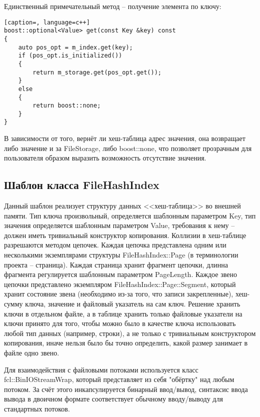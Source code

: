 \documentclass[12pt, a4paper]{fallen_report}
\begin{document}
Единственный примечательный метод – получение элемента по ключу:
\begin{lstlisting}[caption=, language=c++]
boost::optional<Value> get(const Key &key) const 
{
    auto pos_opt = m_index.get(key);
    if (pos_opt.is_initialized()) 
    {
        return m_storage.get(pos_opt.get());
    }
    else
    {
        return boost::none;
    }
}
\end{lstlisting}

В зависимости от того, вернёт ли хеш-таблица адрес значения, она возвращает либо значение и за {\consolas FileStorage}, либо {\consolas boost::none}, что позволяет прозрачным для пользователя образом выразить возможность отсутствие значения.

\pagebreak
\subsection{Шаблон класса FileHashIndex}
Данный шаблон реализует структуру данных <<хеш-таблица>> во внешней памяти. Тип ключа произвольный, определяется шаблонным параметром {\consolas Key}, тип значения определяется шаблонным параметром {\consolas Value}, требования к нему – должен иметь тривиальный конструктор копирования. Коллизии в хеш-таблице разрешаются методом цепочек. Каждая цепочка представлена одним или несколькими экземплярами структуры {\consolas FileHashIndex::Page} (в терминологии проекта – страница). Каждая страница хранит фрагмент цепочки, длинна фрагмента регулируется шаблонным параметром {\consolas PageLength}. Каждое звено цепочки представлено экземпляром {\consolas FileHashIndex::Page::Segment}, который хранит состояние звена (необходимо из-за того, что записи закрепленные), хеш-сумму ключа, значение и файловый указатель на сам ключ. Решение хранить ключи в отдельном файле, а в таблице хранить только файловые указатели на ключи принято для того, чтобы можно было в качестве ключа использовать любой тип данных (например, строки), а не только с тривиальным конструктором копирования, иначе нельзя было бы точно определить, какой размер занимает в файле одно звено. 

Для взаимодействия с файловыми потоками используется класс {\consolas fcl::BinIOStreamWrap}, который представляет из себя "обёртку" над любым потоком. За счёт этого инкапсулируется бинарный ввод/вывод, синтаксис ввода вывода в двоичном формате соответствует обычному вводу/выводу для стандартных потоков.
\end{document}
